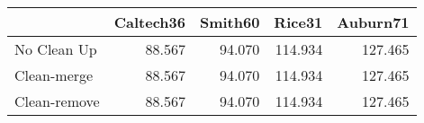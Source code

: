 \begin{tabular}{lrrrr}
\toprule
{} & Caltech36 & Smith60 &  Rice31 & Auburn71 \\
\midrule
No Clean Up  &    88.567 &  94.070 & 114.934 &  127.465 \\
Clean-merge  &    88.567 &  94.070 & 114.934 &  127.465 \\
Clean-remove &    88.567 &  94.070 & 114.934 &  127.465 \\
\bottomrule
\end{tabular}
